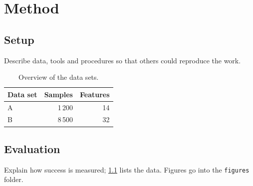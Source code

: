 \chapter{Method}\label{ch:method}

\section{Setup}
Describe data, tools and procedures so that others could reproduce the work.

\begin{table}[ht]
  \centering
  \caption{Overview of the data sets.}
  \label{tab:data}
  \begin{tabular}{lrr}
    \toprule
    Data set & Samples & Features \\
    \midrule
    A & 1\,200 & 14 \\
    B & 8\,500 & 32 \\
    \bottomrule
  \end{tabular}
\end{table}

\section{Evaluation}
Explain how success is measured; \cref{tab:data} lists the data. Figures go into the
\texttt{figures} folder.
